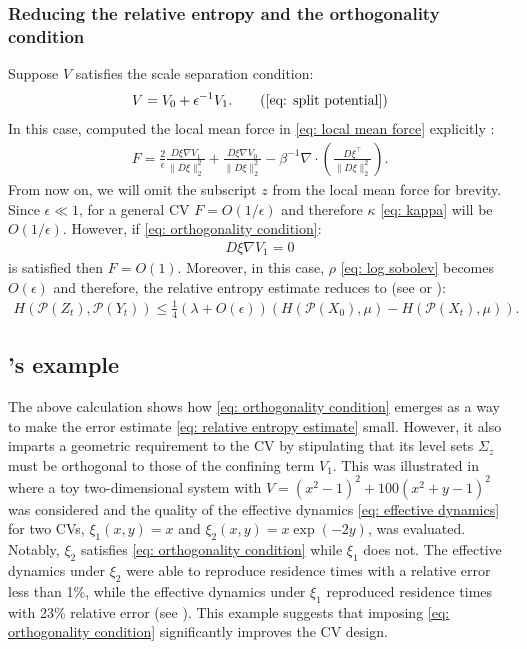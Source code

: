\documentclass[reqno, 12pt]{article}
\begin{document}
\subsubsection{Reducing the relative entropy and the orthogonality condition}

Suppose $V$ satisfies the scale separation condition:
\begin{align}
    V = V_0 + \epsilon^{-1}V_1. \tag{\ref{eq: split potential}} 
\end{align}
In this case, \parencite{legoll2010effective} computed the local mean force in \eqref{eq: local mean force} explicitly \parencite[p. 2150]{legoll2010effective}: 
\begin{align}
    F = \frac{2}{\epsilon} \frac{D\xi \nabla V_1}{\|D\xi\|_{2}^{2}} + \frac{D\xi \nabla V_0}{\|D\xi\|_{2}^{2}} - \beta^{-1}\nabla \cdot  \left(\frac{D\xi^{\top}}{\|D \xi\|_{2}^{2}}\right).
\end{align}
From now on, we will omit the subscript $z$ from the local mean force for brevity.
Since $\epsilon \ll 1$, for a general CV $F = O(1/\epsilon)$ and therefore $\kappa$ \eqref{eq: kappa} will be $O(1/\epsilon)$. However, if \eqref{eq: orthogonality condition}: 
\begin{align*}
    D\xi \nabla V_1 = 0
\end{align*}
is satisfied then $F= O(1)$. Moreover, in this case, $\rho$ \eqref{eq: log sobolev} becomes $O(\epsilon)$ and therefore, the relative entropy estimate reduces to (see \cite[p. 2150]{legoll2010effective} or \cite[Eq. (4.3)]{duong2018quantification}):
\begin{align}
    H(\mathcal{P}(Z_t), \mathcal{P}(Y_t)) \leq \frac{1}{4}\left(\lambda + O(\epsilon)\right)\left(H(\mathcal{P}(X_0), \mu) - H(\mathcal{P}(X_t), \mu)\right). \label{eq: relative entropy estimate, order epsilon}
\end{align}

\subsection{\cite{legoll2010effective}'s example} The above calculation shows how \eqref{eq: orthogonality condition} emerges as a way to make the error estimate \eqref{eq: relative entropy estimate} small. However, it also imparts a geometric requirement to the CV by stipulating that its level sets $\Sigma_z$ must be orthogonal to those of the confining term $V_1$. This was illustrated in \cite[Table 1]{legoll2010effective} where a toy two-dimensional system with $V = (x^2-1)^2 + 100(x^2 + y - 1)^2$ was considered and the quality of the effective dynamics \eqref{eq: effective dynamics} for two CVs, $\xi_1(x,y) = x$ and $\xi_2(x,y) = x\exp(-2y)$, was evaluated. Notably, $\xi_2$ satisfies \eqref{eq: orthogonality condition} while $\xi_1$ does not. The effective dynamics under $\xi_2$ were able to reproduce residence times with a relative error less than 1\%, while the effective dynamics under $\xi_1$ reproduced residence times with 23\% relative error (see \cite[Table 1]{legoll2010effective}). This example suggests that imposing \eqref{eq: orthogonality condition} significantly improves the CV design. 
\end{document}
